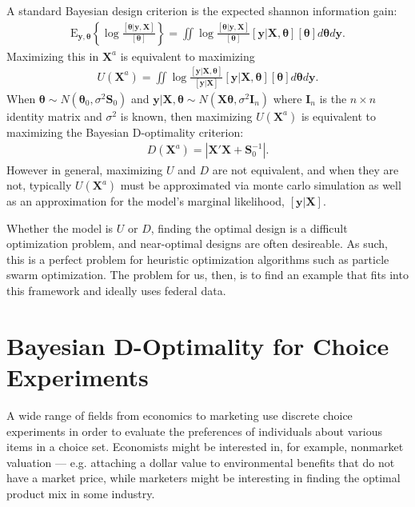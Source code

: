\documentclass[12pt]{article}
\begin{document}
A standard Bayesian design criterion is the expected shannon information gain:
\begin{align*}
\mathrm{E}_{\bm{y},\bm{\theta}}\left\{\log \frac{[\bm{\theta}|\bm{y},\bm{X}]}{[\bm{\theta}]}\right\}    = \iint \log \frac{[\bm{\theta}|\bm{y},\bm{X}]}{[\bm{\theta}]} [\bm{y}|\bm{X},\bm{\theta}][\bm{\theta}] d\bm{\theta} d\bm{y}.
\end{align*}
Maximizing this in $\bm{X}^a$ is equivalent to maximizing
\begin{align*}
U(\bm{X}^a) = \iint \log \frac{[\bm{y}|\bm{X},\bm{\theta}]}{[\bm{y}|\bm{X}]} [\bm{y}|\bm{X},\bm{\theta}][\bm{\theta}] d\bm{\theta} d\bm{y}.
\end{align*}
When $\bm{\theta}\sim N(\bm{\theta}_0, \sigma^2\bm{S}_0)$ and $\bm{y}|\bm{X},\bm{\theta} \sim N(\bm{X}\bm{\theta}, \sigma^2\bm{I}_n)$ where $\bm{I}_n$ is the $n\times n$ identity matrix and $\sigma^2$ is known, then maximizing $U(\bm{X}^a)$ is equivalent to maximizing the Bayesian D-optimality criterion:
\begin{align*}
D(\bm{X}^{a}) = |\bm{X}'\bm{X} + \bm{S}_0^{-1}|.
\end{align*}
However in general, maximizing $U$ and $D$ are not equivalent, and when they are not, typically $U(\bm{X}^a)$ must be approximated via monte carlo simulation as well as an approximation for the model's marginal likelihood, $[\bm{y}|\bm{X}]$.

Whether the model is $U$ or $D$, finding the optimal design is a difficult optimization problem, and near-optimal designs are often desireable. As such, this is a perfect problem for heuristic optimization algorithms such as particle swarm optimization. The problem for us, then, is to find an example that fits into this framework and ideally uses federal data.

\section{Bayesian D-Optimality for Choice Experiments}

A wide range of fields from economics to marketing use discrete choice experiments in order to evaluate the preferences of individuals about various items in a choice set. Economists might be interested in, for example, nonmarket valuation --- e.g. attaching a dollar value to environmental benefits that do not have a market price, while marketers might be interesting in finding the optimal product mix in some industry.
\end{document}
